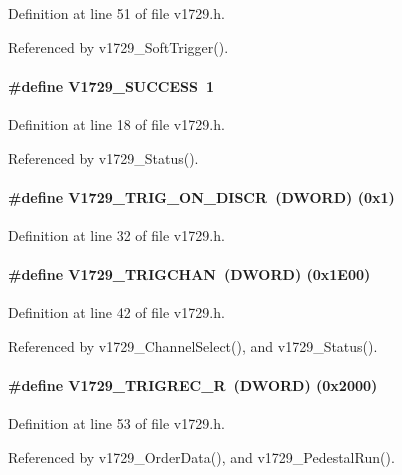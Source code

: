 Definition at line 51 of file v1729.h.

Referenced by v1729\_\-SoftTrigger().
\paragraph[{V1729\_\-SUCCESS}]{\setlength{\rightskip}{0pt plus 5cm}\#define V1729\_\-SUCCESS~1}\hfill\label{v1729_8h_af5046280e0ce71c204115b90f9de3dc3}


Definition at line 18 of file v1729.h.

Referenced by v1729\_\-Status().
\paragraph[{V1729\_\-TRIG\_\-ON\_\-DISCR}]{\setlength{\rightskip}{0pt plus 5cm}\#define V1729\_\-TRIG\_\-ON\_\-DISCR~({\bf DWORD})   (0x1)}\hfill\label{v1729_8h_a9eb0395b752c0440dd523d635b2230c2}


Definition at line 32 of file v1729.h.
\paragraph[{V1729\_\-TRIGCHAN}]{\setlength{\rightskip}{0pt plus 5cm}\#define V1729\_\-TRIGCHAN~({\bf DWORD}) (0x1E00)}\hfill\label{v1729_8h_adeddbb6abb7eb23745f26c7bd212f8d7}


Definition at line 42 of file v1729.h.

Referenced by v1729\_\-ChannelSelect(), and v1729\_\-Status().
\paragraph[{V1729\_\-TRIGREC\_\-R}]{\setlength{\rightskip}{0pt plus 5cm}\#define V1729\_\-TRIGREC\_\-R~({\bf DWORD}) (0x2000)}\hfill\label{v1729_8h_a34bfbf23d78723eee27842e066c7ae41}


Definition at line 53 of file v1729.h.

Referenced by v1729\_\-OrderData(), and v1729\_\-PedestalRun().
